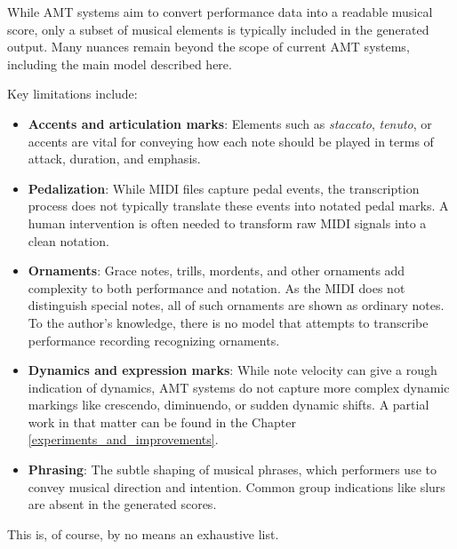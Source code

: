 While AMT systems aim to convert performance data into a readable musical score, only a subset of musical elements is typically included in the generated output. Many nuances remain beyond the scope of current AMT systems, including the main model described here.

Key limitations include: \begin{itemize}
	\item {\bf Accents and articulation marks}: Elements such as \emph{staccato}, \emph{tenuto}, or accents are vital for conveying how each note should be played in terms of attack, duration, and emphasis. 
	\item {\bf Pedalization}: While MIDI files capture pedal events, the transcription process does not typically translate these events into notated pedal marks. A human intervention is often needed to transform raw MIDI signals into a clean notation.
	\item {\bf Ornaments}: Grace notes, trills, mordents, and other ornaments add complexity to both performance and notation. As the MIDI does not distinguish special notes, all of such ornaments are shown as ordinary notes. To the author's knowledge, there is no model that attempts to transcribe performance recording recognizing ornaments.
	\item {\bf Dynamics and expression marks}: While note velocity can give a rough indication of dynamics, AMT systems do not capture more complex dynamic markings like crescendo, diminuendo, or sudden dynamic shifts. A partial work in that matter can be found in the Chapter \ref{experiments_and_improvements}.
	\item {\bf Phrasing}: The subtle shaping of musical phrases, which performers use to convey musical direction and intention. Common group indications like slurs are absent in the generated scores. \end{itemize}

This is, of course, by no means an exhaustive list.

